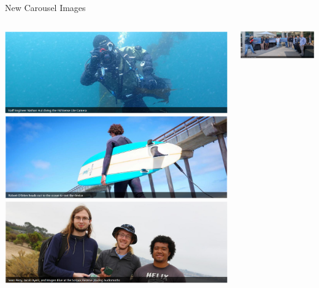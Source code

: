 \begin{frame}{New Carousel Images}
    \begin{columns}
        \begin{column}{0.33\textwidth}
            \includegraphics[width=\linewidth]{images/web_carousel_1.png}
            \includegraphics[width=\linewidth]{images/web_carousel_2.png}
            \includegraphics[width=\linewidth]{images/web_carousel_3.png}
        \end{column}
        \begin{column}{0.33\textwidth}
            \includegraphics[width=\linewidth]{images/web_carousel_4.png}

\end{column}
\end{columns}
\end{frame}
